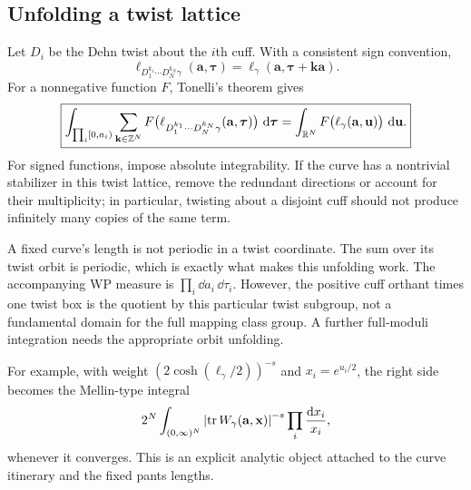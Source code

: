 \subsection{Unfolding a twist lattice}

Let $D_i$ be the Dehn twist about the $i$th cuff. With a consistent sign
convention,
\[
 \ell_{D_1^{k_1}\cdots D_N^{k_N}\gamma}(\mathbf a,\boldsymbol\tau)
 =\ell_\gamma(\mathbf a,\boldsymbol\tau+\mathbf k\mathbf a).
\]
For a nonnegative function $F$, Tonelli's theorem gives
\begin{equation}
 \boxed{
 \int_{\prod_i[0,a_i)}\sum_{\mathbf k\in\mathbb Z^N}
 F\bigl(\ell_{D_1^{k_1}\cdots D_N^{k_N}\gamma}
                  (\mathbf a,\boldsymbol\tau)\bigr)\,\mathop{}\!\mathrm d\boldsymbol\tau
 =\int_{\mathbb R^N}F\bigl(\ell_\gamma(\mathbf a,\mathbf u)\bigr)\,\mathop{}\!\mathrm d\mathbf u.}
 \label{eq:twistunfold}
\end{equation}
For signed functions, impose absolute integrability. If the curve has a
nontrivial stabilizer in this twist lattice, remove the redundant directions
or account for their multiplicity; in particular, twisting about a disjoint
cuff should not produce infinitely many copies of the same term.

A fixed curve's length is not periodic in a twist coordinate. The sum over
its twist orbit is periodic, which is exactly what makes this unfolding
work. The accompanying WP measure is $\prod_i\dd a_i\,\dd\tau_i$.
However, the positive cuff orthant times one twist box is the quotient by
this particular twist subgroup, not a fundamental domain for the full
mapping class group. A further full-moduli integration needs the appropriate
orbit unfolding.

For example, with weight $(2\cosh(\ell_\gamma/2))^{-s}$ and
$x_i=e^{u_i/2}$, the right side becomes the Mellin-type integral
\begin{equation}
 2^N\int_{(0,\infty)^N}
 \left|\operatorname{tr} W_\gamma(\mathbf a,\mathbf x)\right|^{-s}
             \prod_i\frac{\mathop{}\!\mathrm d x_i}{x_i},
 \label{eq:mellin}
\end{equation}
whenever it converges. This is an explicit analytic object attached to the
curve itinerary and the fixed pants lengths.

